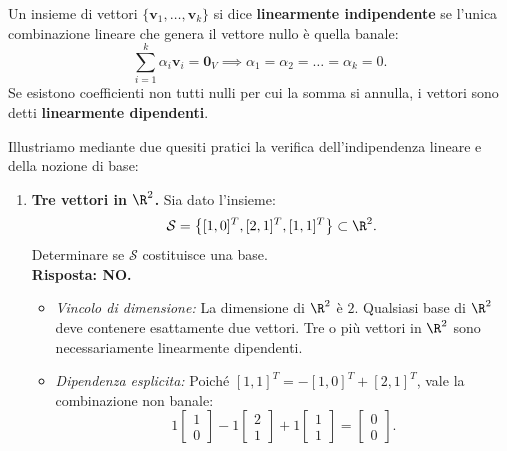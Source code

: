 \begin{definition}
Un insieme di vettori $\{\mathbf{v}_1, \dots, \mathbf{v}_k\}$ si dice \textbf{linearmente indipendente} se l'unica combinazione lineare che genera il vettore nullo è quella banale:
\begin{equation}
    \sum_{i=1}^k \alpha_i \mathbf{v}_i = \mathbf{0}_V \implies \alpha_1 = \alpha_2 = \dots = \alpha_k = 0.
\end{equation}
Se esistono coefficienti non tutti nulli per cui la somma si annulla, i vettori sono detti \textbf{linearmente dipendenti}.
\end{definition}

\begin{example}
Illustriamo mediante due quesiti pratici la verifica dell'indipendenza lineare e della nozione di base:
\begin{enumerate}
    \item \textbf{Tre vettori in $\R^2$.} Sia dato l'insieme:
    \[
        \mathcal{S} = \left\{ [1, 0]^T, [2, 1]^T, [1, 1]^T \right\} \subset \R^2.
    \]
    Determinare se $\mathcal{S}$ costituisce una base. \\
    \textbf{Risposta: NO.}
    \begin{itemize}
        \item \textit{Vincolo di dimensione:} La dimensione di $\R^2$ è $2$. Qualsiasi base di $\R^2$ deve contenere esattamente due vettori. Tre o più vettori in $\R^2$ sono necessariamente linearmente dipendenti.
        \item \textit{Dipendenza esplicita:} Poiché $[1, 1]^T = -[1, 0]^T + [2, 1]^T$, vale la combinazione non banale:
        \begin{equation}
            1 \begin{bmatrix} 1 \\ 0 \end{bmatrix} - 1 \begin{bmatrix} 2 \\ 1 \end{bmatrix} + 1 \begin{bmatrix} 1 \\ 1 \end{bmatrix} = \begin{bmatrix} 0 \\ 0 \end{bmatrix}.
        \end{equation}
    \end{itemize}

\end{enumerate}
\end{example}
